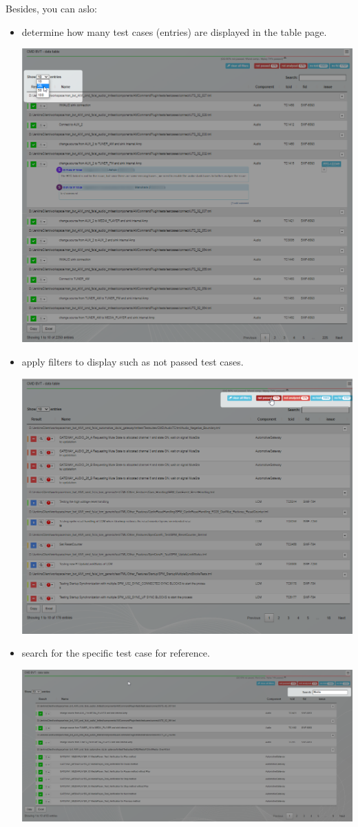 Besides, you can aslo:
\begin{itemize}
   \item determine how many test cases (entries) are displayed in the table page.

         \includegraphics[width=0.6\linewidth]
         {./pictures/datatable/change_number_entries.png}
         
   \item apply filters to display such as not passed test cases.
   
         \includegraphics[width=0.6\linewidth]
         {./pictures/datatable/apply_filter.png}

   \item search for the specific test case for reference.
   
         \includegraphics[width=0.6\linewidth]{./pictures/datatable/search.png}


\end{itemize}
